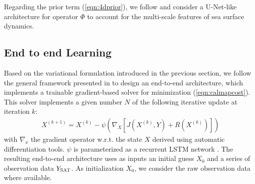 \documentclass{article}
\begin{document}
Regarding the prior term (\ref{eqn:4dprior}), we follow \cite{fablet_james} and consider a U-Net-like architecture for operator $\Phi$ to account for the multi-scale features of sea surface dynamics.

\subsection{End to end Learning}

Based on the variational formulation introduced in the previous section, we follow the general framework presented in \cite{fablet_james} to design an end-to-end architecture, which implements a trainable gradient-based solver for minimization (\ref{eqn:calmapcost}). This solver implements a given number $N$ of the following iterative update at iteration $k$:  %
\begin{equation}
	\begin{split}
	& X^{(k+1)} =  X^{(k)} - \psi(\nabla_{X}[J(X^{(k)}, Y) + R(X^{(k)})])
	\end{split}
\end{equation}
with $\nabla_{x}$ the gradient operator w.r.t. the state $X$ derived using automatic differentiation tools. $\psi$ is parameterized as a recurrent LSTM network   \cite{lstm}.  The resulting end-to-end architecture uses as inputs an initial guess $X_{0}$
and a series of observation data $Y_{\textsc{SAT}}$. As initialization $X_{0}$, we consider the raw observation data where available.
\end{document}
